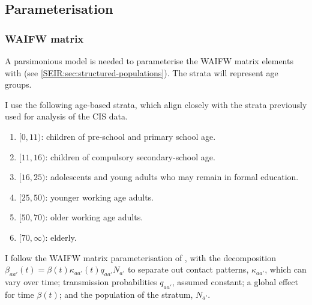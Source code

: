\documentclass[thesis.tex]{subfiles}
\begin{document}
\subsection{Parameterisation} \label{SEIR:sec:parameterisation}

\subsubsection{WAIFW matrix}


A parsimonious model is needed to parameterise the WAIFW matrix elements with (see \cref{SEIR:sec:structured-populations}).
The strata will represent age groups.

I use the following age-based strata, which align closely with the strata previously used for analysis of the CIS data.
\begin{enumerate}
    \item $[0, 11)$: children of pre-school and primary school age.
    \item $[11, 16)$: children of compulsory secondary-school age.
    \item $[16, 25)$: adolescents and young adults who may remain in formal education.
    \item $[25, 50)$: younger working age adults.
    \item $[50, 70)$: older working age adults.
    \item $[70, \infty)$: elderly.
\end{enumerate}

I follow the WAIFW matrix parameterisation of \textcite{birrellRealtime}, with the decomposition $\beta_{aa'}(t) = \beta(t) \kappa_{aa'}(t) q_{aa'} N_{a'}$ to separate out contact patterns, $\kappa_{aa'}$, which can vary over time; transmission probabilities $q_{aa'}$, assumed constant; a global effect for time $\beta(t)$; and the population of the stratum, $N_{a'}$.
\end{document}

